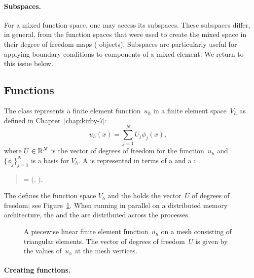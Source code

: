 \paragraph{Subspaces.}

For a mixed function space, one may access its subspaces. These
subspaces differ, in general, from the function spaces that were used to
create the mixed space in their degree of freedom maps (
objects). Subspaces are particularly useful for applying boundary
conditions to components of a mixed element. We return to this
issue below.

\subsection{Functions}

The  class represents a finite element
function~$u_h$ in a finite element space~$V_h$ as defined in
Chapter~\ref{chap:kirby-7}:
\begin{equation}
  u_h(x) = \sum_{j=1}^N U_j \phi_j(x),
\end{equation}
where $U \in \mathbb{R}^N$ is the vector of degrees of freedom for the
function~$u_h$ and $\{\phi_j\}_{j=1}^N$ is a basis for $V_h$.  A
 is represented in terms of a  and a
:
\begin{verse}
  \centering
   = (,\; ).
\end{verse}
The  defines the function space $V_h$ and the
 holds the vector~$U$ of degrees of freedom; see
Figure~\ref{fig:logg-2:femsolution}. When running in parallel on a
distributed memory architecture, the  and the
 are distributed across the processes.

\begin{figure}
\bwfig
  \centering
  \caption{A piecewise linear finite element function~$u_h$ on a
    mesh consisting of triangular elements. The vector of degrees of
    freedom~$U$ is given by the values of~$u_h$ at the mesh
    vertices.}
  \label{fig:logg-2:femsolution}
\end{figure}

\enlargethispage{12pt}

\paragraph{Creating functions.}

